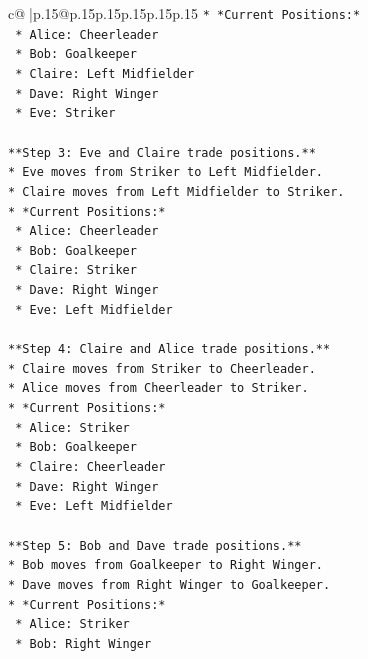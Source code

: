 \documentclass{article}
\begin{document}
{\begin{supertabular}{c@{$\;$}|p{.15\linewidth}@{}p{.15\linewidth}p{.15\linewidth}p{.15\linewidth}p{.15\linewidth}p{.15\linewidth}}
{{{\texttt{*   *Current Positions:*} \\
\texttt{    *   Alice: Cheerleader} \\
\texttt{    *   Bob: Goalkeeper} \\
\texttt{    *   Claire: Left Midfielder} \\
\texttt{    *   Dave: Right Winger} \\
\texttt{    *   Eve: Striker} \\
\\ 
\texttt{**Step 3: Eve and Claire trade positions.**} \\
\texttt{*   Eve moves from Striker to Left Midfielder.} \\
\texttt{*   Claire moves from Left Midfielder to Striker.} \\
\texttt{*   *Current Positions:*} \\
\texttt{    *   Alice: Cheerleader} \\
\texttt{    *   Bob: Goalkeeper} \\
\texttt{    *   Claire: Striker} \\
\texttt{    *   Dave: Right Winger} \\
\texttt{    *   Eve: Left Midfielder} \\
\\ 
\texttt{**Step 4: Claire and Alice trade positions.**} \\
\texttt{*   Claire moves from Striker to Cheerleader.} \\
\texttt{*   Alice moves from Cheerleader to Striker.} \\
\texttt{*   *Current Positions:*} \\
\texttt{    *   Alice: Striker} \\
\texttt{    *   Bob: Goalkeeper} \\
\texttt{    *   Claire: Cheerleader} \\
\texttt{    *   Dave: Right Winger} \\
\texttt{    *   Eve: Left Midfielder} \\
\\ 
\texttt{**Step 5: Bob and Dave trade positions.**} \\
\texttt{*   Bob moves from Goalkeeper to Right Winger.} \\
\texttt{*   Dave moves from Right Winger to Goalkeeper.} \\
\texttt{*   *Current Positions:*} \\
\texttt{    *   Alice: Striker} \\
\texttt{    *   Bob: Right Winger} \\
}}}
\end{supertabular}}
\end{document}
